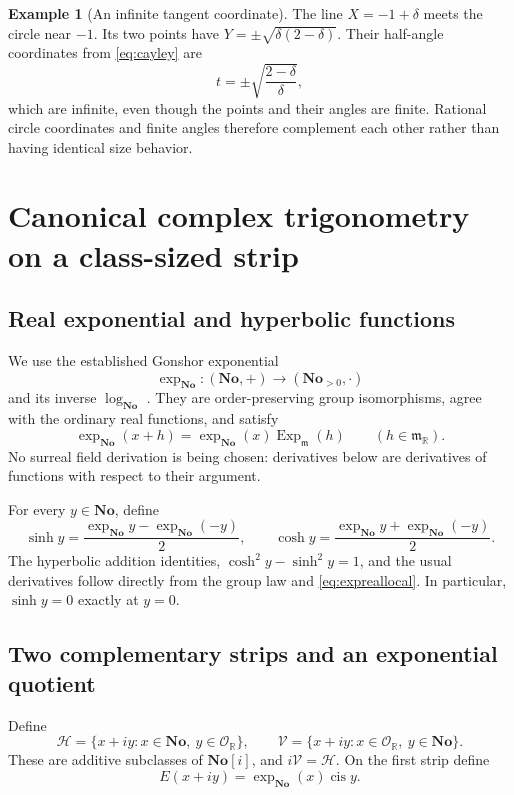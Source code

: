 \documentclass[11pt]{article}
\numberwithin{equation}{section}
\theoremstyle{definition}
\newtheorem{example}[theorem]{Example}
\newcommand{\No}{\mathbf{No}}
\newcommand{\SC}{\mathbf{No}[i]}
\newcommand{\R}{\mathbb R}
\newcommand{\OO}{\mathcal O}
\newcommand{\mm}{\mathfrak m}
\newcommand{\cis}{\operatorname{cis}}
\newcommand{\Ex}{\operatorname{Exp}_{\mm}}
\begin{document}
\begin{example}[An infinite tangent coordinate]
The line $X=-1+\delta$ meets the circle near $-1$. Its two points have $Y=\pm\sqrt{\delta(2-\delta)}$. Their half-angle coordinates from \eqref{eq:cayley} are
\[
 t=\pm\sqrt{\frac{2-\delta}{\delta}},
\]
which are infinite, even though the points and their angles are finite. Rational circle coordinates and finite angles therefore complement each other rather than having identical size behavior.
\end{example}

\section{Canonical complex trigonometry on a class-sized strip}\label{sec:strip}
\subsection{Real exponential and hyperbolic functions}
We use the established Gonshor exponential
\[
 \exp_{\No}:(\No,+)\longrightarrow(\No_{>0},\cdot)
\]
and its inverse $\log_{\No}$ \cite{Gonshor,vdDE}. They are order-preserving group isomorphisms, agree with the ordinary real functions, and satisfy
\begin{equation}\label{eq:expreallocal}
 \exp_{\No}(x+h)=\exp_{\No}(x)\Ex(h)
 \qquad(h\in\mm_{\R}).
\end{equation}
No surreal field derivation is being chosen: derivatives below are derivatives of functions with respect to their argument.

For every $y\in\No$, define
\[
 \sinh y=\frac{\exp_{\No}y-\exp_{\No}(-y)}2,\qquad
 \cosh y=\frac{\exp_{\No}y+\exp_{\No}(-y)}2.
\]
The hyperbolic addition identities, $\cosh^2y-\sinh^2y=1$, and the usual derivatives follow directly from the group law and \eqref{eq:expreallocal}. In particular, $\sinh y=0$ exactly at $y=0$.

\subsection{Two complementary strips and an exponential quotient}
Define
\[
 \mathscr H=\{x+iy:x\in\No,\ y\in\OO_{\R}\},\qquad
 \mathscr V=\{x+iy:x\in\OO_{\R},\ y\in\No\}.
\]
These are additive subclasses of $\SC$, and $i\mathscr V=\mathscr H$. On the first strip define
\begin{equation}\label{eq:stripexp}
 E(x+iy)=\exp_{\No}(x)\cis y.
\end{equation}
\end{document}
